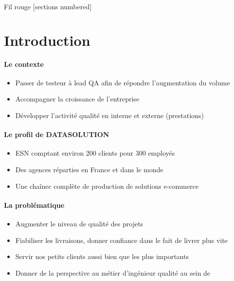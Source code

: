 \titleframe

\begin{frame}{Fil rouge}
  [sections numbered]
  \tableofcontents%
\end{frame}


\section{Introduction}
\begin{frame}{\insertsectionhead}
  \framesubtitle{Le contexte}

  \begin{itemize}
    \item Passer de testeur à lead QA afin de répondre l'augmentation du volume
    \item Accompagner la croissance de l'entreprise
    \item Développer l'activité qualité en interne et externe (prestations)
  \end{itemize}
\end{frame}

\begin{frame}{\insertsectionhead}
  \framesubtitle{Le profil de DATASOLUTION}
  \begin{itemize}
    \item ESN comptant environ 200 clients pour 300 employés
    \item Des agences réparties en France et dans le monde
    \item Une chaînec complète de production de solutions e-commerce
  \end{itemize}
\end{frame}

\begin{frame}{\insertsectionhead}
  \framesubtitle{La problématique}
  \begin{itemize}
    \item Augmenter le niveau de qualité des projets
    \item Fiabiliser les livraisons, donner confiance dans le fait de livrer plus vite
    \item Servir nos petits clients aussi bien que les plus importants
    \item Donner de la perspective au métier d'ingénieur qualité au sein de \datasolution
  \end{itemize}
\end{frame}

